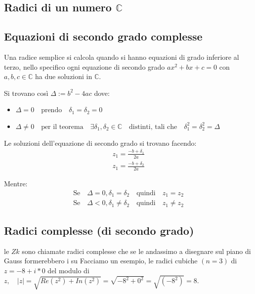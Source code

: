 \documentclass{article}
\theoremstyle{definition}
\begin{document}

\subsection{Radici di un numero $ \mathbb{C} $}


\subsection{Equazioni di secondo grado complesse}
Una radice semplice si calcola quando si hanno equazioni di grado inferiore al terzo, nello specifico ogni equazione di secondo grado $ax^2+bx+c = 0$ con $a,b,c \in \mathbb{C}$ ha due soluzioni in $\mathbb{C}$. \par
Si trovano così  $\Delta := b^2 - 4ac$ dove:
\begin{itemize}
        \item $\Delta = 0 \quad \mbox{prendo} \quad \delta_1 = \delta_2 = 0$	
        \item $\Delta \not = 0 \quad \mbox{per il teorema} \quad \exists \delta_1,\delta_2 \in \mathbb{C} \quad \mbox{distinti, tali che} \quad \delta_1^2 = \delta_2^2 = \Delta$	
\end{itemize}

Le soluzioni dell'equazione di secondo grado si trovano facendo:
\begin{align}
        z_1 = \frac{-b + \delta_1}{2a} \\
        z_1 = \frac{-b + \delta_2}{2a} 
\end{align}

Mentre:
\begin{align}
        \mbox{Se} \quad \Delta = 0, \delta_1=\delta_2 \quad \mbox{quindi} \quad z_1=z_2 \\
        \mbox{Se} \quad \Delta < 0, \delta_1 \not = \delta_2 \quad \mbox{quindi} \quad z_1 \not = z_2 
\end{align}



\subsection{Radici complesse (di secondo grado)}
le $Zk$ sono chiamate radici complesse che se le andassimo a disegnare sul piano di Gauss formerebbero i su \newline
Facciamo un esempio, le radici cubiche $(n=3)$ di $z = -8 +i*0$ del modulo di $z, \quad|z| = \sqrt{Re(z^2)+In(z^2)} = \sqrt{-8^2 + 0^2} = \sqrt{(-8^2)} = 8$.
\end{document}
